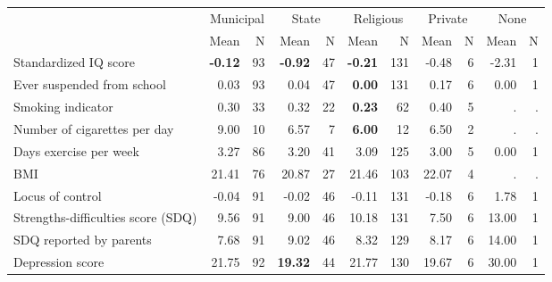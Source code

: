 \begin{tabular}{l r r r r r r r r r r}
\toprule
& \multicolumn{2}{c}{Municipal} & \multicolumn{2}{c}{State} & \multicolumn{2}{c}{Religious} & \multicolumn{2}{c}{Private} & \multicolumn{2}{c}{None} \\
& \scriptsize Mean & \scriptsize N & \scriptsize Mean & \scriptsize N & \scriptsize Mean & \scriptsize N & \scriptsize Mean & \scriptsize N & \scriptsize Mean & \scriptsize N \\
\midrule
Standardized IQ score & \textbf{    -0.12} &        93 & \textbf{    -0.92} &        47 & \textbf{    -0.21} &       131 &     -0.48 &         6 &     -2.31 &         1 \\
Ever suspended from school &      0.03 &        93 &      0.04 &        47 & \textbf{     0.00} &       131 &      0.17 &         6 &      0.00 &         1 \\
Smoking indicator &      0.30 &        33 &      0.32 &        22 & \textbf{     0.23} &        62 &      0.40 &         5 &         . & . \\
Number of cigarettes per day &      9.00 &        10 &      6.57 &         7 & \textbf{     6.00} &        12 &      6.50 &         2 &         . & . \\
Days exercise per week &      3.27 &        86 &      3.20 &        41 &      3.09 &       125 &      3.00 &         5 &      0.00 &         1 \\
BMI &     21.41 &        76 &     20.87 &        27 &     21.46 &       103 &     22.07 &         4 &         . & . \\
Locus of control &     -0.04 &        91 &     -0.02 &        46 &     -0.11 &       131 &     -0.18 &         6 &      1.78 &         1 \\
Strengths-difficulties score (SDQ) &      9.56 &        91 &      9.00 &        46 &     10.18 &       131 &      7.50 &         6 &     13.00 &         1 \\
SDQ reported by parents &      7.68 &        91 &      9.02 &        46 &      8.32 &       129 &      8.17 &         6 &     14.00 &         1 \\
Depression score &     21.75 &        92 & \textbf{    19.32} &        44 &     21.77 &       130 &     19.67 &         6 &     30.00 &         1 \\
\bottomrule
\end{tabular}
